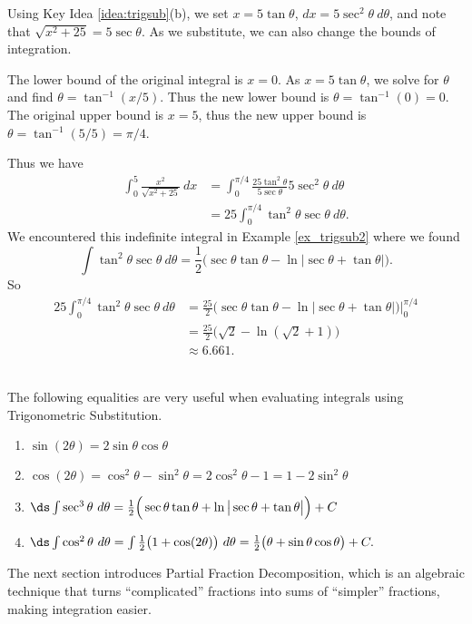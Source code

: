 {Using Key Idea \ref{idea:trigsub}(b), we set $x=5\tan\theta$, $dx = 5\sec^2\theta\ d\theta$, and note that $\sqrt{x^2+25} = 5\sec\theta$. As we substitute, we can also change the bounds of integration.

The lower bound of the original integral is $x=0$. As $x=5\tan\theta$, we solve for $\theta$ and find $\theta = \tan^{-1}(x/5)$. Thus the new lower bound is $\theta = \tan^{-1}(0) = 0$. The original upper bound is $x=5$, thus the new upper bound is $\theta = \tan^{-1}(5/5) = \pi/4$. 

Thus we have 
\begin{align*}
\int_0^5\frac{x^2}{\sqrt{x^2+25}}\ dx &= \int_0^{\pi/4} \frac{25\tan^2\theta}{5\sec\theta}5\sec^2\theta\ d\theta\\
		&= 25\int_0^{\pi/4} \tan^2\theta\sec\theta\ d\theta.
\end{align*}
We encountered this indefinite integral in Example \ref{ex_trigsub2} where we found 
$$\int \tan^2\theta\sec\theta \ d\theta = \frac12\big(\sec\theta\tan\theta-\ln|\sec\theta+\tan\theta|\big).$$
So
\begin{align*}
25\int_0^{\pi/4} \tan^2\theta\sec\theta\ d\theta &= \frac{25}2\big(\sec\theta\tan\theta-\ln|\sec\theta+\tan\theta|\big)\Bigg|_0^{\pi/4}\\
&= \frac{25}2\big(\sqrt2-\ln(\sqrt2+1)\big)\\
&\approx 6.661.
\end{align*}
\baselineskip
}\\

The following equalities are very useful when evaluating integrals using Trigonometric Substitution. 

{\begin{enumerate}
	\item	$\sin(2\theta) = 2\sin\theta\cos\theta$
	\item	$\cos(2\theta) = \cos^2\theta - \sin^2\theta = 2\cos^2\theta-1 = 1-2\sin^2\theta$
	\item $\ds \int \sec^3\theta\ d\theta = \frac12\Big(\sec \theta\tan \theta + \ln\big|\sec \theta+\tan \theta\big|\Big)+C$
	\item	$\ds \int \cos^2\theta\ d\theta = \int \frac12\big(1+\cos(2\theta)\big)\ d\theta = \frac12\big(\theta+\sin\theta\cos\theta\big)+C.$
\end{enumerate}
}

The next section introduces Partial Fraction Decomposition, which is an algebraic technique that turns ``complicated'' fractions into sums of ``simpler'' fractions, making integration easier.




